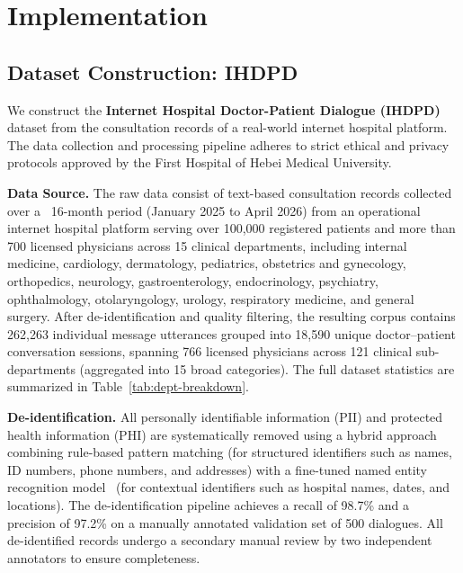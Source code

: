 
\section{Implementation}\label{section:implementation}

\subsection{Dataset Construction: IHDPD}

We construct the \textbf{Internet Hospital Doctor-Patient Dialogue (IHDPD)} dataset from the consultation records of a real-world internet hospital platform. The data collection and processing pipeline adheres to strict ethical and privacy protocols approved by the First Hospital of Hebei Medical University.

\textbf{Data Source.} The raw data consist of text-based consultation records collected over a ~16-month period (January 2025 to April 2026) from an operational internet hospital platform serving over 100,000 registered patients and more than 700 licensed physicians across 15 clinical departments, including internal medicine, cardiology, dermatology, pediatrics, obstetrics and gynecology, orthopedics, neurology, gastroenterology, endocrinology, psychiatry, ophthalmology, otolaryngology, urology, respiratory medicine, and general surgery. After de-identification and quality filtering, the resulting corpus contains 262,263 individual message utterances grouped into 18,590 unique doctor--patient conversation sessions, spanning 766 licensed physicians across 121 clinical sub-departments (aggregated into 15 broad categories). The full dataset statistics are summarized in Table~\ref{tab:dept-breakdown}.

\textbf{De-identification.} All personally identifiable information (PII) and protected health information (PHI) are systematically removed using a hybrid approach combining rule-based pattern matching (for structured identifiers such as names, ID numbers, phone numbers, and addresses) with a fine-tuned named entity recognition model~\cite{johnsonMIMICIIIFreelyAccessible2016} (for contextual identifiers such as hospital names, dates, and locations). The de-identification pipeline achieves a recall of 98.7\% and a precision of 97.2\% on a manually annotated validation set of 500 dialogues. All de-identified records undergo a secondary manual review by two independent annotators to ensure completeness.

